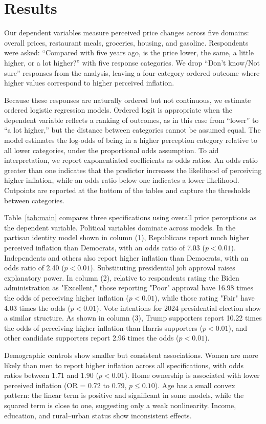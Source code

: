 \documentclass[preprint,12pt,authoryear]{elsarticle}
\begin{document}
\section{Results}
Our dependent variables measure perceived price changes across five domains: overall prices, restaurant meals, groceries, housing, and gasoline. Respondents were asked: “Compared with five years ago, is the price lower, the same, a little higher, or a lot higher?” with five response categories. We drop “Don’t know/Not sure” responses from the analysis, leaving a four-category ordered outcome where higher values correspond to higher perceived inflation.

Because these responses are naturally ordered but not continuous, we estimate ordered logistic regression models. Ordered logit is appropriate when the dependent variable reflects a ranking of outcomes, as in this case from “lower” to “a lot higher,” but the distance between categories cannot be assumed equal. The model estimates the log-odds of being in a higher perception category relative to all lower categories, under the proportional odds assumption. To aid interpretation, we report exponentiated coefficients as odds ratios. An odds ratio greater than one indicates that the predictor increases the likelihood of perceiving higher inflation, while an odds ratio below one indicates a lower likelihood. Cutpoints are reported at the bottom of the tables and capture the thresholds between categories.

Table~\ref{tab:main} compares three specifications using overall price perceptions as the dependent variable. Political variables dominate across models. In the partisan identity model shown in column (1), Republicans report much higher perceived inflation than Democrats, with an odds ratio of 7.03 ($p<0.01$). Independents and others also report higher inflation than Democrats, with an odds ratio of 2.40 ($p<0.01$). Substituting presidential job approval raises explanatory power. In column (2), relative to respondents rating the Biden administration as "Excellent," those reporting "Poor" approval have 16.98 times the odds of perceiving higher inflation ($p<0.01$), while those rating "Fair" have 4.03 times the odds ($p<0.01$). Vote intentions for 2024 presidential election show a similar structure. As shown in column (3), Trump supporters report 10.22 times the odds of perceiving higher inflation than Harris supporters ($p<0.01$), and other candidate supporters report 2.96 times the odds ($p<0.01$).  

Demographic controls show smaller but consistent associations. Women are more likely than men to report higher inflation across all specifications, with odds ratios between 1.71 and 1.90 ($p<0.01$). Home ownership is associated with lower perceived inflation (OR = 0.72 to 0.79, $p\leq 0.10$). Age has a small convex pattern: the linear term is positive and significant in some models, while the squared term is close to one, suggesting only a weak nonlinearity. Income, education, and rural--urban status show inconsistent effects.  
\end{document}
